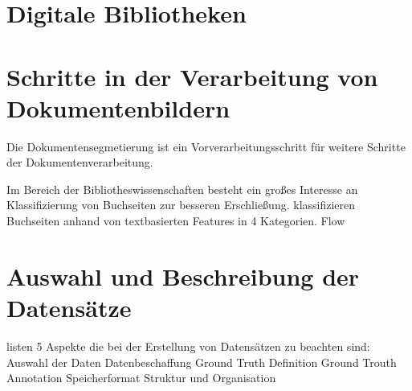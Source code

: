 \section{Digitale Bibliotheken}


\section{Schritte in der Verarbeitung von Dokumentenbildern}
Die Dokumentensegmetierung ist ein Vorverarbeitungsschritt für weitere Schritte der Dokumentenverarbeitung.

Im Bereich der Bibliotheswissenschaften besteht ein großes Interesse an Klassifizierung von
Buchseiten zur besseren Erschließung.
\cite{McConnaugheyLabeledSegmentationPrinted2017} klassifizieren Buchseiten anhand von textbasierten Features in 4 Kategorien. 
Flow

\section{Auswahl und Beschreibung der Datensätze}
\textcite[985\psqq]{DoermannHandbookdocumentimage2014} listen 5 Aspekte die bei der Erstellung von Datensätzen zu beachten sind:
Auswahl der Daten
Datenbeschaffung
Ground Truth Definition
Ground Trouth Annotation
Speicherformat
Struktur und Organisation

